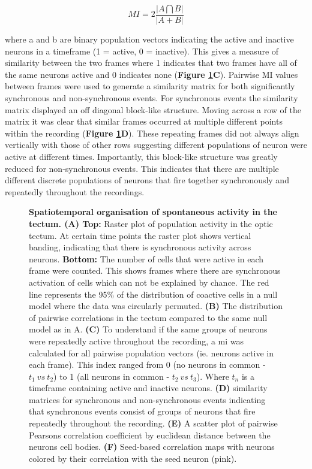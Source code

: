 \begin{equation}
    MI = 2\frac{\left | A \bigcap B \right |}{\left |  A + B\right |}
\end{equation}

where a and b are binary population vectors indicating the active and inactive neurons in a timeframe (1 = active, 0 = inactive). This gives a measure of similarity between the two frames where 1 indicates that two frames have all of the same neurons active and 0 indicates none (\textbf{Figure \ref{fig:R1_F3}C}). Pairwise MI values between frames were used to generate a similarity matrix for both significantly synchronous and non-synchronous events. For synchronous events the similarity matrix displayed an off diagonal block-like structure. Moving across a row of the matrix it was clear that similar frames occurred at multiple different points within the recording (\textbf{Figure \ref{fig:R1_F3}D}). These repeating frames did not always align vertically with those of other rows suggesting different populations of neuron were active at different times.  Importantly, this block-like structure was greatly reduced for non-synchronous events. This indicates that there are multiple different discrete populations of neurons that fire together synchronously and repeatedly throughout the recordings. 

\begin{figure}[!htb]
        \caption[\label{fig:R1_F3} \textbf{Spatiotemporal organisation of spontaneous activity in the tectum.}]{\label{fig:R1_F3} \textbf{Spatiotemporal organisation of spontaneous activity in the tectum.  (A) Top:} Raster plot of population activity in the optic tectum. At certain time points the raster plot shows vertical banding, indicating that there is synchronous activity  across neurons. \textbf{Bottom:} The  number of cells that were active in each frame were counted. This shows frames where there are synchronous activation of cells which can not be explained by chance. The red line represents the 95\% of the distribution of coactive cells in a null model where the data was circularly permuted.  \textbf{(B)} The distribution of pairwise correlations in the tectum compared to the same null model as in A. \textbf{(C)} To understand if the same groups of neurons were repeatedly active throughout the recording, a \gls{mi} was calculated for all pairwise population vectors (ie. neurons active in each frame). This index ranged from 0 (no neurons in common - $t_{1} \ vs \ t_{2}$) to 1 (all neurons in common - $t_{2} \ vs \ t_{3}$). Where $t_{n}$ is a timeframe containing active and inactive neurons. \textbf{(D)} similarity matrices for synchronous and non-synchronous events indicating that synchronous events consist of groups of neurons that fire repeatedly throughout the recording. \textbf{(E)} A scatter plot of pairwise Pearsons correlation coefficient by euclidean distance between the neurons cell bodies. \textbf{(F)} Seed-based correlation maps with neurons colored by their correlation with the seed neuron (pink).}
      \end{figure}
      
